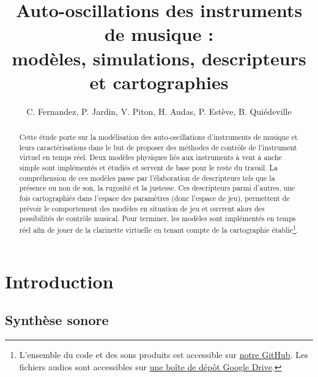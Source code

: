 \documentclass[french, twocolumn]{article}
\newcommand{\lyxaddress}[1]{
	\par {\raggedright #1
	\vspace{1.4em}
	\noindent\par}
}
\begin{document}

\title{Auto-oscillations des instruments de musique :\\ modèles, simulations, descripteurs et cartographies}
\author{
C. Fernandez, P. Jardin, V. Piton, H. Audas, P. Estève, B. Quiédeville}
\maketitle




\begin{abstract}

Cette étude porte sur la modélisation des auto-oscillations d'instruments de musique et leurs caractérisations dans le but de proposer des méthodes de contrôle de l'instrument virtuel en temps réel. Deux modèles physiques liés aux instruments à vent à anche simple sont implémentés et étudiés et servent de base pour le reste du travail. La compréhension de ces modèles passe par l'élaboration de descripteurs tels que la présence ou non de son, la rugosité et la justesse. Ces descripteurs parmi d'autres, une fois cartographiés dans l'espace des paramètres (donc l'espace de jeu), permettent de prévoir le comportement des modèles en situation de jeu et ouvrent alors des possibilités de contrôle musical. Pour terminer, les modèles sont implémentés en temps réel afin de jouer de la clarinette virtuelle en tenant compte de la cartographie établie\footnote{L'ensemble du code et des sons produits est accessible sur \href{https://github.com/estevep/PAM-Auto-oscillations-des-instruments-de-musique}{notre GitHub}. Les fichiers audios sont accessibles sur \href{https://drive.google.com/drive/folders/189lTTHx_M80OPUk3jBsUVSBXIAPBLjux?usp=sharing}{une boîte de dépôt Google Drive}.}.

\end{abstract}



% 

\section{Introduction}

\subsection{Synthèse sonore}
\end{document}
